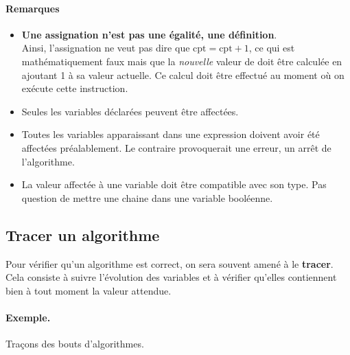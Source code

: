 			\paragraph{Remarques}
			
				\begin{itemize}
				\item 
					\textbf{Une assignation n'est pas une égalité, une définition}.
					\\Ainsi, l'assignation 
					ne veut pas dire que $\textrm{cpt} = \textrm{cpt} + 1$,
					ce qui est mathématiquement faux 
					mais que la \emph{nouvelle} valeur de 
					doit être calculée en ajoutant 1 à sa valeur actuelle.
					Ce calcul doit être effectué au moment 
					où on exécute cette instruction. 
				\item 
					Seules les variables déclarées peuvent être affectées.
				\item 
					Toutes les variables apparaissant dans une expression
					doivent avoir été affectées préalablement. 
					Le contraire provoquerait une erreur,
					un arrêt de l’algorithme.
				\item 
					La valeur affectée à une variable 
					doit être compatible avec son type.
					Pas question de mettre une chaine dans une variable
					booléenne.
				\end{itemize}
				
		\subsection{Tracer un algorithme}
		
			Pour vérifier qu'un algorithme est correct,
			on sera souvent amené à le \textbf{tracer}.
			Cela consiste à suivre l'évolution des variables
			et à vérifier qu'elles contiennent bien à tout moment
			la valeur attendue.
			
			\paragraph{Exemple.} Traçons des bouts d'algorithmes.
			
